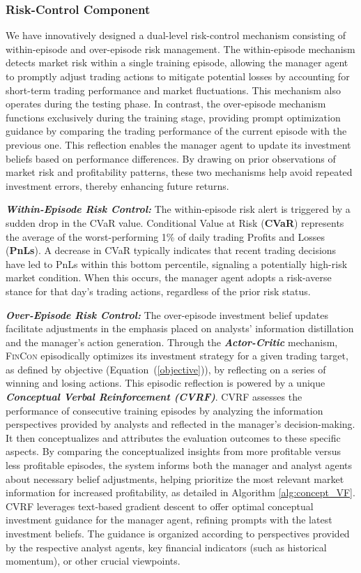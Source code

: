 \subsubsection{Risk-Control Component} 
We have innovatively designed a dual-level risk-control mechanism consisting of within-episode and over-episode risk management. The within-episode mechanism detects market risk within a single training episode, allowing the manager agent to promptly adjust trading actions to mitigate potential losses by accounting for short-term trading performance and market fluctuations. This mechanism also operates during the testing phase. In contrast, the over-episode mechanism functions exclusively during the training stage, providing prompt optimization guidance by comparing the trading performance of the current episode with the previous one. This reflection enables the manager agent to update its investment beliefs based on performance differences. By drawing on prior observations of market risk and profitability patterns, these two mechanisms help avoid repeated investment errors, thereby enhancing future returns.

\textbf{\textit{Within-Episode Risk Control:}} The within-episode risk alert is triggered by a sudden drop in the CVaR value. Conditional Value at Risk (\textbf{CVaR}) represents the average of the worst-performing 1\% of daily trading Profits and Losses (\textbf{PnLs}). A decrease in CVaR typically indicates that recent trading decisions have led to PnLs within this bottom percentile, signaling a potentially high-risk market condition. When this occurs, the manager agent adopts a risk-averse stance for that day's trading actions, regardless of the prior risk status.

\textbf{\textit{Over-Episode Risk Control:}} The over-episode investment belief updates facilitate adjustments in the emphasis placed on analysts' information distillation and the manager's action generation. Through the \textit{\textbf{Actor-Critic}} mechanism, \textsc{FinCon} episodically optimizes its investment strategy for a given trading target, as defined by objective (Equation~(\ref{objective})), by reflecting on a series of winning and losing actions. This episodic reflection is powered by a unique \textit{\textbf{Conceptual Verbal Reinforcement (CVRF)}}. CVRF assesses the performance of consecutive training episodes by analyzing the information perspectives provided by analysts and reflected in the manager's decision-making. It then conceptualizes and attributes the evaluation outcomes to these specific aspects. By comparing the conceptualized insights from more profitable versus less profitable episodes, the system informs both the manager and analyst agents about necessary belief adjustments, helping prioritize the most relevant market information for increased profitability, as detailed in Algorithm \ref{alg:concept_VF}. CVRF leverages text-based gradient descent to offer optimal conceptual investment guidance for the manager agent, refining prompts with the latest investment beliefs. The guidance is organized according to perspectives provided by the respective analyst agents, key financial indicators (such as historical momentum), or other crucial viewpoints.

